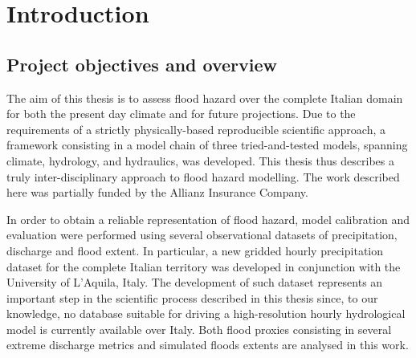 \chapter{Introduction}

\section{Project objectives and overview}
The aim of this thesis is to assess flood hazard over the complete Italian domain for both the present day climate and for future projections. Due to the requirements of a strictly physically-based reproducible scientific approach, a framework consisting in a model chain of three tried-and-tested models, spanning climate, hydrology, and hydraulics, was developed. This thesis thus describes a truly inter-disciplinary approach to flood hazard modelling. The work described here was partially funded by the Allianz Insurance Company.

In order to obtain a reliable representation of flood hazard, model calibration and evaluation were performed using several observational datasets of precipitation, discharge and flood extent. In particular, a new gridded hourly precipitation dataset for the complete Italian territory was developed in conjunction with the University of L'Aquila, Italy. The development of such dataset represents an important step in the scientific process described in this thesis since, to our knowledge, no database suitable for driving a high-resolution hourly hydrological model is currently available over Italy. Both flood proxies consisting in several extreme discharge metrics and simulated floods extents are analysed in this work.

